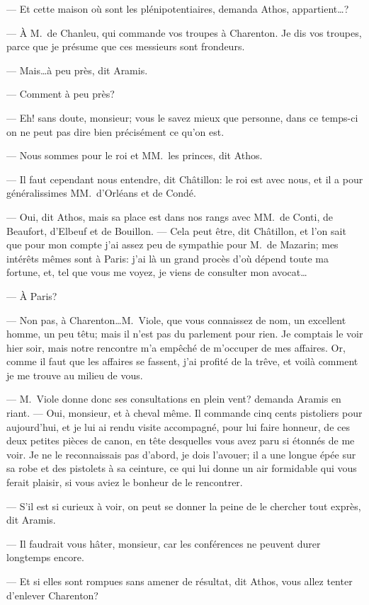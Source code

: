 — Et cette maison où sont les plénipotentiaires, demanda Athos, appartient\dots?

— À M.~de Chanleu, qui commande vos troupes à Charenton. Je dis vos troupes, parce que je présume que ces messieurs sont frondeurs.

— Mais\dots à peu près, dit Aramis.

— Comment à peu près?

— Eh! sans doute, monsieur; vous le savez mieux que personne, dans ce temps-ci on ne peut pas dire bien précisément ce qu'on est.

— Nous sommes pour le roi et MM.~les princes, dit Athos.

— Il faut cependant nous entendre, dit Châtillon: le roi est avec nous, et il a pour généralissimes MM.~d'Orléans et de Condé.

— Oui, dit Athos, mais sa place est dans nos rangs avec MM.~de Conti, de Beaufort, d'Elbeuf et de Bouillon.
— Cela peut être, dit Châtillon, et l'on sait que pour mon compte j'ai assez peu de sympathie pour M.~de Mazarin; mes intérêts mêmes sont à Paris: j'ai là un grand procès d'où dépend toute ma fortune, et, tel que vous me voyez, je viens de consulter mon avocat\dots

— À Paris?

— Non pas, à Charenton\dots M.~Viole, que vous connaissez de nom, un excellent homme, un peu têtu; mais il n'est pas du parlement pour rien. Je comptais le voir hier soir, mais notre rencontre m'a empêché de m'occuper de mes affaires. Or, comme il faut que les affaires se fassent, j'ai profité de la trêve, et voilà comment je me trouve au milieu de vous.

— M.~Viole donne donc ses consultations en plein vent? demanda Aramis en riant.
— Oui, monsieur, et à cheval même. Il commande cinq cents pistoliers pour aujourd'hui, et je lui ai rendu visite accompagné, pour lui faire honneur, de ces deux petites pièces de canon, en tête desquelles vous avez paru si étonnés de me voir. Je ne le reconnaissais pas d'abord, je dois l'avouer; il a une longue épée sur sa robe et des pistolets à sa ceinture, ce qui lui donne un air formidable qui vous ferait plaisir, si vous aviez le bonheur de le rencontrer.

— S'il est si curieux à voir, on peut se donner la peine de le chercher tout exprès, dit Aramis.

— Il faudrait vous hâter, monsieur, car les conférences ne peuvent durer longtemps encore.

— Et si elles sont rompues sans amener de résultat, dit Athos, vous allez tenter d'enlever Charenton?

